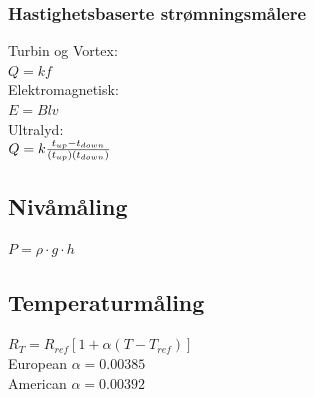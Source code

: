 \documentclass[10pt,a5paper]{article}
\begin{document}
\subsubsection*{Hastighetsbaserte strømningsmålere}
Turbin og Vortex:\\
$Q=kf$\\
Elektromagnetisk:\\
$E=Blv$\\
Ultralyd:\\
$Q = k {t_{up} - t_{down} \over (t_{up})(t_{down})}$\\
 
\subsection{Nivåmåling}

$P = \rho \cdot g \cdot h $\\
\subsection{Temperaturmåling}
$R_T = R_{ref}[1 + \alpha(T - T_{ref})]$\\
European $\alpha=0.00385$\\
American $\alpha=0.00392$\\
\vfil \eject
\end{document}
